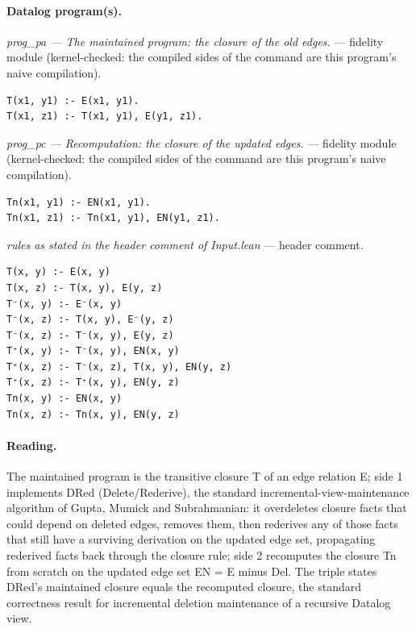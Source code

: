 \documentclass[10pt]{article}
\begin{document}
\paragraph{Datalog program(s).}

{\raggedright\textit{prog\_pa --- The maintained program: the closure of the old edges.} --- fidelity module (kernel-checked: the compiled sides of the command are this program's naive compilation).\par}

\begin{Verbatim}[fontsize=\scriptsize,breaklines=true,breakanywhere=true,frame=single,framesep=1.5mm]
T(x1, y1) :- E(x1, y1).
T(x1, z1) :- T(x1, y1), E(y1, z1).
\end{Verbatim}

{\raggedright\textit{prog\_pc --- Recomputation: the closure of the updated edges.} --- fidelity module (kernel-checked: the compiled sides of the command are this program's naive compilation).\par}

\begin{Verbatim}[fontsize=\scriptsize,breaklines=true,breakanywhere=true,frame=single,framesep=1.5mm]
Tn(x1, y1) :- EN(x1, y1).
Tn(x1, z1) :- Tn(x1, y1), EN(y1, z1).
\end{Verbatim}

{\raggedright\textit{rules as stated in the header comment of Input.lean} --- header comment.\par}

\begin{Verbatim}[fontsize=\scriptsize,breaklines=true,breakanywhere=true,frame=single,framesep=1.5mm]
T(x, y) :- E(x, y)
T(x, z) :- T(x, y), E(y, z)
T⁻(x, y) :- E⁻(x, y)
T⁻(x, z) :- T(x, y), E⁻(y, z)
T⁻(x, z) :- T⁻(x, y), E(y, z)
T⁺(x, y) :- T⁻(x, y), EN(x, y)
T⁺(x, z) :- T⁻(x, z), T(x, y), EN(y, z)
T⁺(x, z) :- T⁺(x, y), EN(y, z)
Tn(x, y) :- EN(x, y)
Tn(x, z) :- Tn(x, y), EN(y, z)
\end{Verbatim}

\paragraph{Reading.} The maintained program is the transitive closure T of an edge relation E; side 1 implements DRed (Delete/Rederive), the standard incremental-view-maintenance algorithm of Gupta, Mumick and Subrahmanian: it overdeletes closure facts that could depend on deleted edges, removes them, then rederives any of those facts that still have a surviving derivation on the updated edge set, propagating rederived facts back through the closure rule; side 2 recomputes the closure Tn from scratch on the updated edge set EN = E minus Del. The triple states DRed's maintained closure equals the recomputed closure, the standard correctness result for incremental deletion maintenance of a recursive Datalog view.
\end{document}
